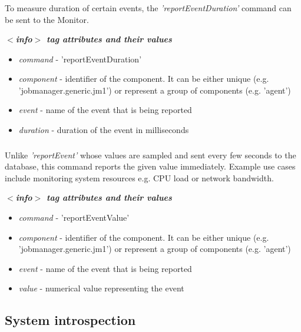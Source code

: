 \subsubsection{}
\label{sct:reporteventduration}
To measure duration of certain events, the \emph{'reportEventDuration'} command can be sent to the Monitor.

\emph{\bf $<$info$>$ tag attributes and their values}
\begin{itemize}
  \item \emph{command} - 'reportEventDuration'
  \item \emph{component} - identifier of the component. It can be either unique (e.g. 'jobmanager.generic.jm1') or represent a group of components (e.g. 'agent')
  \item \emph{event} - name of the event that is being reported
  \item \emph{duration} - duration of the event in milliseconds
\end{itemize}


\subsubsection{}
\label{sct:reporteventvalue}
Unlike \emph{'reportEvent'} whose values are sampled and sent every few seconds to the database, this command reports the given value immediately. Example use cases include monitoring system resources e.g. CPU load or network bandwidth.

\emph{\bf $<$info$>$ tag attributes and their values}
\begin{itemize}
  \item \emph{command} - 'reportEventValue'
  \item \emph{component} - identifier of the component. It can be either unique (e.g. 'jobmanager.generic.jm1') or represent a group of components (e.g. 'agent')
  \item \emph{event} - name of the event that is being reported
  \item \emph{value} - numerical value representing the event
\end{itemize}

\newpage 
\subsection{System introspection}

